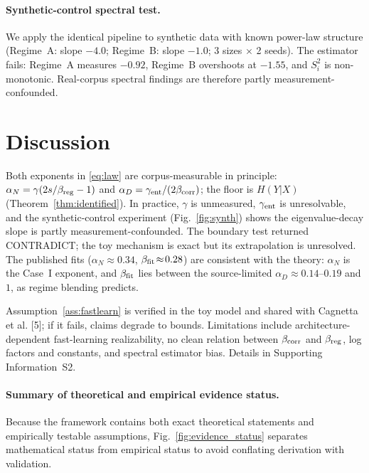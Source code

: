 \documentclass[entropy,article,submit,moreauthors,pdftex]{Definitions/mdpi}
\begin{document}
\paragraph{Synthetic-control spectral test.}
\label{numerics:synth}
We apply the identical pipeline to synthetic data with known power-law
structure (Regime~A: slope $-4.0$; Regime~B: slope $-1.0$; 3 sizes $\times$ 2
seeds). The estimator fails: Regime~A measures $-0.92$, Regime~B overshoots at
$-1.55$, and $S_i^2$ is non-monotonic. Real-corpus spectral findings are
therefore partly measurement-confounded.


\section{Discussion}
\label{sec:discussion}

Both exponents in \eqref{eq:law} are corpus-measurable in principle:
$\alpha_N=\gamma(2s/\beta_{\rm reg}-1)$ and
$\alpha_D=\gamma_{\rm ent}/(2\beta_{\rm corr})$; the floor is
$H(Y|X)$ (Theorem~\ref{thm:identified}).  In practice, $\gamma$ is unmeasured,
$\gamma_{\rm ent}$ is unresolvable, and the synthetic-control experiment (Fig.~\ref{fig:synth}) shows
the eigenvalue-decay slope is partly measurement-confounded.  The boundary test
returned CONTRADICT; the toy mechanism is exact but its extrapolation is
unresolved.  The published fits ($\alpha_N\!\approx\!0.34$,
$\beta_{\rm fit}\!\approx\!0.28$) are consistent with the theory: $\alpha_N$ is
the Case~I exponent, and $\beta_{\rm fit}$ lies between the source-limited
$\alpha_D\!\approx\!0.14$--$0.19$ and $1$, as regime blending predicts.

Assumption~\ref{ass:fastlearn} is verified in the toy model and shared with
Cagnetta et al. [5]; if it fails, claims degrade to bounds.  Limitations include
architecture-dependent fast-learning realizability, no clean relation between
$\beta_{\rm corr}$ and $\beta_{\rm reg}$, log factors and constants, and
spectral estimator bias.  Details in Supporting Information~S2.

\paragraph{Summary of theoretical and empirical evidence status.}
Because the framework contains both exact theoretical statements and
empirically testable assumptions, Fig.~\ref{fig:evidence_status} separates
mathematical status from empirical status to avoid conflating derivation with
validation.
\end{document}
